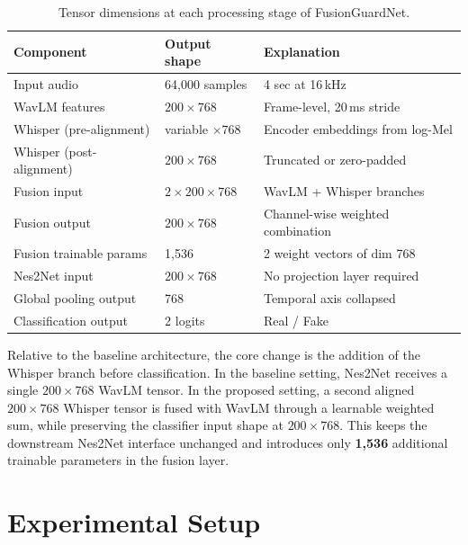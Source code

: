 \documentclass[11pt,a4paper]{article}
\begin{document}
\begin{table}[htbp]
  \centering
  \caption{Tensor dimensions at each processing stage of FusionGuardNet.}
  \label{tab:dims}
  \begin{tabular}{L{4.2cm}L{3.5cm}L{5.5cm}}
    \toprule
    Component & Output shape & Explanation \\
    \midrule
    Input audio              & 64,000 samples        & 4 sec at 16\,kHz \\
    WavLM features           & $200\times768$        & Frame-level, 20\,ms stride \\
    Whisper (pre-alignment)  & variable $\times768$  & Encoder embeddings from log-Mel \\
    Whisper (post-alignment) & $200\times768$        & Truncated or zero-padded \\
    Fusion input             & $2\times200\times768$ & WavLM + Whisper branches \\
    Fusion output            & $200\times768$        & Channel-wise weighted combination \\
    Fusion trainable params  & 1,536                 & 2 weight vectors of dim 768 \\
    Nes2Net input            & $200\times768$        & No projection layer required \\
    Global pooling output    & 768                   & Temporal axis collapsed \\
    Classification output    & 2 logits              & Real / Fake \\
    \bottomrule
  \end{tabular}
\end{table}

Relative to the baseline architecture, the core change is the addition of the
Whisper branch before classification. In the baseline setting, Nes2Net receives a
single $200\times768$ WavLM tensor. In the proposed setting, a second aligned
$200\times768$ Whisper tensor is fused with WavLM through a learnable weighted
sum, while preserving the classifier input shape at $200\times768$. This keeps the
downstream Nes2Net interface unchanged and introduces only \textbf{1,536}
additional trainable parameters in the fusion layer.

\section{Experimental Setup}
\end{document}
